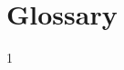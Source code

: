 \documentclass[mscthesis]{usiinfthesis}
\begin{document}
\backmatter

\chapter{Glossary} %

%
%



1
\end{document}
